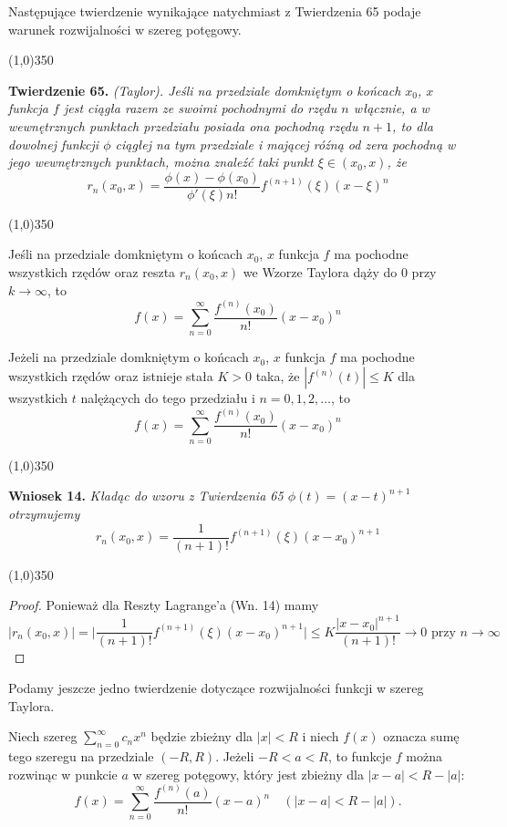 \documentclass[leqno]{article}
\newcommand{\hr}{\begin{center} \line(1,0){350} \end{center}}
\begin{document}
\begin{justify}
Następujące twierdzenie wynikające natychmiast z Twierdzenia 65 podaje warunek rozwijalności w szereg potęgowy.
\hr
    \textbf{Twierdzenie 65.}\label{theorem:65}
    \emph{
        (Taylor). Jeśli na przedziale domkniętym o końcach $x_0$, $x$ funkcja $f$ jest ciągła razem ze swoimi pochodnymi do rzędu $n$ włącznie, 
        a w wewnętrznych punktach przedziału posiada ona pochodną rzędu $n + 1$, to dla dowolnej funkcji $\phi$ ciągłej
        na tym przedziale i mającej róźną od zera pochodną w jego wewnętrznych punktach, można znaleźć taki punkt $\xi \in (x_0, x)$, że
        \[
            r_n(x_0, x) = \frac{\phi(x) - \phi(x_0)}{\phi'(\xi)n!}f^{(n+1)}(\xi){(x-\xi)}^n
        \]
    }
\hr

\begin{theorem}
{
    Jeśli na przedziale domkniętym o końcach $x_0$, $x$ funkcja $f$ ma pochodne wszystkich rzędów oraz reszta $r_n(x_0, x)$ we Wzorze Taylora dąży do $0$ 
    przy $k \to \infty$, to
    \[
        f(x) = \sum_{n=0}^{\infty}\frac{f^{(n)}(x_0)}{n!}{(x - x_0)}^n
    \]
}
\end{theorem}

\begin{wniosek}
{
    Jeżeli na przedziale domkniętym o końcach $x_0$, $x$ funkcja $f$ ma pochodne wszystkich rzędów oraz istnieje
    stała $K > 0$ taka, że $|f^{(n)}(t)| \leqslant K$ dla wszystkich $t$ nalężących do tego przedziału i $n = 0,1,2,\ldots$, to
    \[
        f(x) = \sum_{n=0}^{\infty}\frac{f^{(n)}(x_0)}{n!}{(x - x_0)}^n
    \]
}
\end{wniosek}

\hr
    \textbf{Wniosek 14.}\label{wniosek:14}
    \emph{
        Kładąc do wzoru z Twierdzenia 65 $\phi(t) = {(x-t)}^{n+1}$ otrzymujemy 
        \[
            r_n(x_0, x) = \frac{1}{(n+1)!}f^{(n+1)}(\xi){(x-x_0)}^{n+1}
        \]
    }
\hr

\begin{proof}
    Ponieważ dla Reszty Lagrange'a (Wn. 14) mamy
    \[
        |r_n(x_0, x)| = \Big| \frac{1}{(n+1)!}f^{(n+1)}(\xi){(x-x_0)}^{n+1}\Big| \leqslant K \frac{{|x-x_0|}^{n+1}}{(n+1)!} \to 0 \text{ przy } n \to \infty
    \]
\end{proof}

Podamy jeszcze jedno twierdzenie dotyczące rozwijalności funkcji w szereg Taylora.

\begin{theorem}
{
    Niech szereg $\sum\limits_{n=0}^{\infty}c_n x^n$ będzie zbieżny dla $|x| < R$ i niech $f(x)$ oznacza sumę tego szeregu na przedziale
    $(-R, R)$. Jeżeli $-R < a < R$, to funkcje $f$ można rozwinąc w punkcie $a$ w szereg potęgowy, który jest zbieżny dla $|x - a| < R - |a|$:
    \[
        f(x) = \sum_{n=0}^{\infty}\frac{f^{(n)}(a)}{n!}{(x-a)}^n \quad (|x-a| < R - |a|).
    \]
}
\end{theorem}


\end{justify}
\end{document}
